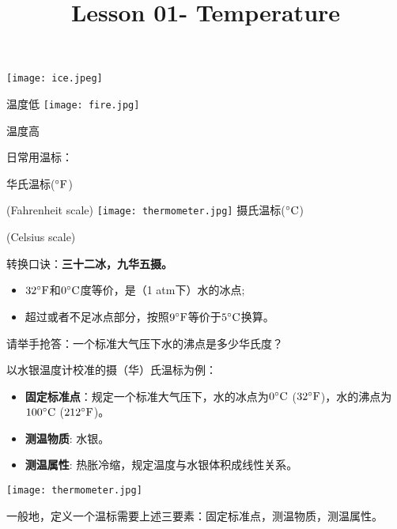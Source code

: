 \documentclass[CJK]{beamer}
\title{Lesson 01- Temperature}
\author{}
\date{}
\begin{document}

\begin{frame}
\bch
{\large 

\skiplines

\texttt{[image: ice.jpeg]}

温度低
\emini
{}
\texttt{[image: fire.jpg]}

温度高
\emini
}
\ech
\end{frame}


\begin{frame}
\bch

日常用温标：
\skiplines

华氏温标(${^\circ \mathrm{F}}$)

(Fahrenheit scale)
\emini
{}
\texttt{[image: thermometer.jpg]}
\emini
{}
摄氏温标($^\circ \mathrm{C}$)

(Celsius scale)
\emini

\ech
\end{frame}


\begin{frame}
\bch
\skipline
转换口诀：{\bf 三十二冰，九华五摄。}
\begin{itemize}
\item{$32{^\circ \mathrm{F}}$和$0^\circ \mathrm{C}$度等价，是（1 atm下）水的冰点;}
\item{超过或者不足冰点部分，按照$9{^\circ \mathrm{F}}$等价于$5^\circ \mathrm{C}$换算。}
\end{itemize}

\skiplines

请举手抢答：一个标准大气压下水的沸点是多少华氏度？
\ech
\end{frame}



\begin{frame}
\bch
以水银温度计校准的摄（华）氏温标为例：
\begin{itemize}
\item{{\bf 固定标准点}：规定一个标准大气压下，水的冰点为$0^\circ \mathrm{C}$ ($32{^\circ \mathrm{F}}$)，水的沸点为$100^\circ \mathrm{C}$ ($212{^\circ \mathrm{F}}$)。}
\item{{\bf 测温物质}: 水银。}
\item{{\bf 测温属性}: 热胀冷缩，规定温度与水银体积成线性关系。} 
\end{itemize}
\emini
{}
\texttt{[image: thermometer.jpg]}
\emini

\skipline

一般地，定义一个温标需要上述三要素：固定标准点，测温物质，测温属性。
\ech
\end{frame}
\end{document}
